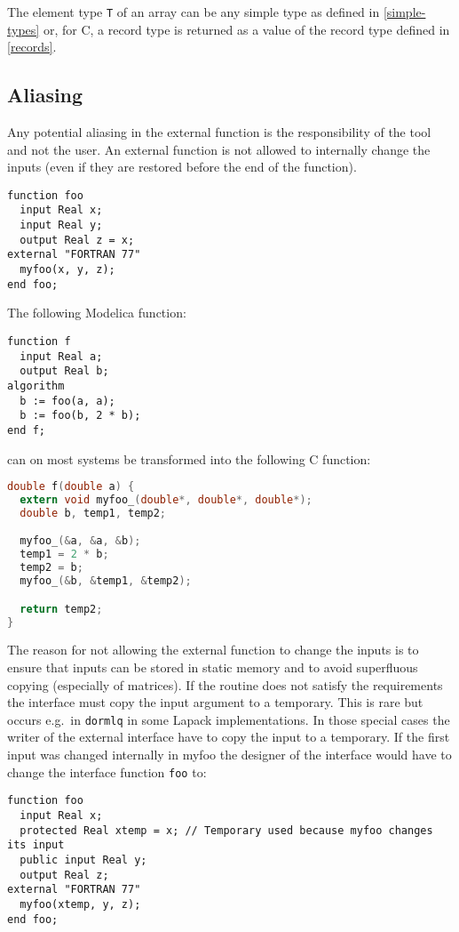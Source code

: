 The element type \lstinline!T! of an array can be any simple type as defined in
\cref{simple-types} or, for C, a record type is returned as a value of the
record type defined in \cref{records}.

\subsection{Aliasing}\label{aliasing}

Any potential aliasing in the external function is the responsibility of
the tool and not the user. An external function is not allowed to
internally change the inputs (even if they are restored before the end
of the function).

\begin{example}
\begin{lstlisting}[language=modelica]
function foo
  input Real x;
  input Real y;
  output Real z = x;
external "FORTRAN 77"
  myfoo(x, y, z);
end foo;
\end{lstlisting}
The following Modelica function:
\begin{lstlisting}[language=modelica]
function f
  input Real a;
  output Real b;
algorithm
  b := foo(a, a);
  b := foo(b, 2 * b);
end f;
\end{lstlisting}
can on most systems be transformed into the following C function:
\begin{lstlisting}[language=C]
double f(double a) {
  extern void myfoo_(double*, double*, double*);
  double b, temp1, temp2;

  myfoo_(&a, &a, &b);
  temp1 = 2 * b;
  temp2 = b;
  myfoo_(&b, &temp1, &temp2);

  return temp2;
}
\end{lstlisting}

The reason for not allowing the external function to change the
inputs is to ensure that inputs can be stored in static memory and to
avoid superfluous copying (especially of matrices). If the routine does
not satisfy the requirements the interface must copy the input argument
to a temporary. This is rare but occurs e.g.\ in \lstinline!dormlq! in some
Lapack implementations. In those special cases the writer of the
external interface have to copy the input to a temporary. If the first
input was changed internally in myfoo the designer of the interface
would have to change the interface function \lstinline!foo! to:
\begin{lstlisting}[language=modelica]
function foo
  input Real x;
  protected Real xtemp = x; // Temporary used because myfoo changes its input
  public input Real y;
  output Real z;
external "FORTRAN 77"
  myfoo(xtemp, y, z);
end foo;
\end{lstlisting}


\end{example}
